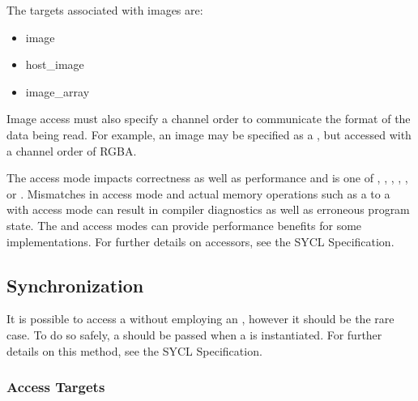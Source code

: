 \documentclass[letterpaper,10pt,english]{sphinxmanual}
\begin{document}
The targets associated with images are:
\begin{itemize}
\item {} 
image

\item {} 
host\_image

\item {} 
image\_array

\end{itemize}

Image access must also specify a channel order to communicate the format
of the data being read. For example, an image may be specified as a
, but accessed with a channel order of RGBA.

The access mode impacts correctness as well as performance and is one of
, , , ,
, or . Mismatches in access mode and
actual memory operations such as a  to a  with access
mode  can result in compiler diagnostics as well as erroneous
program state. The  and  access
modes can provide performance benefits for some implementations. For
further details on accessors, see the SYCL Specification.


\subsection{Synchronization}
\label{\detokenize{programming-model/synchronization:synchronization}}\label{\detokenize{programming-model/synchronization:id1}}\label{\detokenize{programming-model/synchronization::doc}}
It is possible to access a  without employing an ,
however it should be the rare case. To do so safely, a 
should be passed when a  is instantiated. For further details
on this method, see the SYCL Specification.
\subsubsection*{Access Targets}
\end{document}
